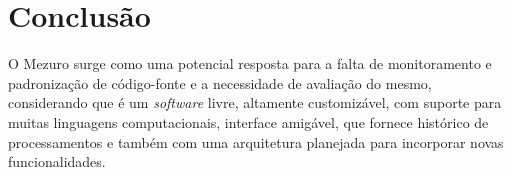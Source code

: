 \documentclass{llncs}
\begin{document}
\section{Conclusão}
O Mezuro surge como uma potencial resposta para a falta de monitoramento e padronização de código-fonte e a necessidade de avaliação do mesmo, considerando que é um \textit{software} livre, altamente customizável, com suporte para muitas linguagens computacionais, interface amigável, que fornece histórico de processamentos e também com uma arquitetura planejada para incorporar novas funcionalidades.



\end{document}

